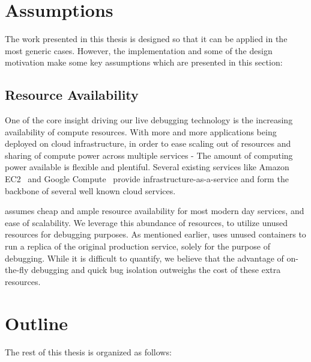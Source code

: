 \section{Assumptions}
\label{sec:introAssumptions}

The work presented in this thesis is designed so that it can be applied in the most generic cases. 
However, the implementation and some of the design motivation make some key assumptions which are presented in this section:

\subsection{Resource Availability}
One of the core insight driving our live debugging technology is the increasing availability of compute resources. 
With more and more applications being deployed on cloud infrastructure, in order to ease scaling out of resources and sharing of compute power across multiple services - The amount of computing power available is flexible and plentiful.
Several existing services like Amazon EC2~\cite{ec2} and Google Compute~\cite{gcompute} provide infrastructure-as-a-service and form the backbone of several well known cloud services. 

\parikshan assumes cheap and ample resource availability for most modern day services, and ease of scalability. We leverage this abundance of resources, to utilize unused resources for debugging purposes.
As mentioned earlier, \parikshan uses unused containers to run a replica of the original production service, solely for the purpose of debugging.
While it is difficult to quantify, we believe that the advantage of on-the-fly debugging and quick bug isolation outweighs the cost of these extra resources. 

\section{Outline}
\label{sec:introOutline}

The rest of this thesis is organized as follows:


